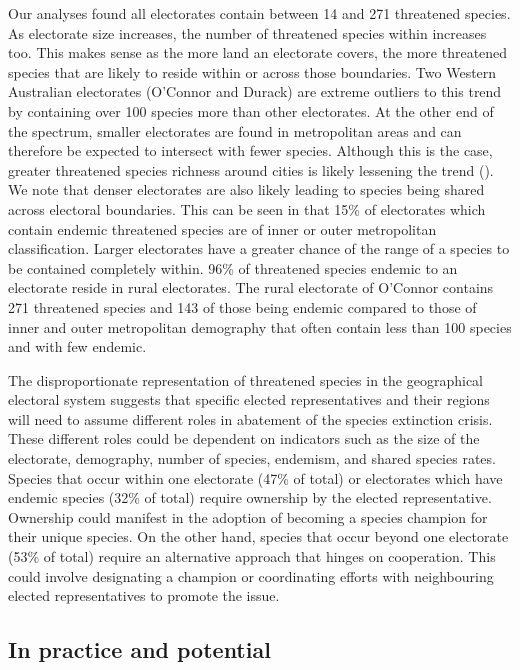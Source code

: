 \documentclass[a4paper,11pt]{article}
\begin{document}
Our analyses found all electorates contain between 14 and 271 threatened species. As electorate size increases, the number of threatened species within increases too. This makes sense as the more land an electorate covers, the more threatened species that are likely to reside within or across those boundaries. Two Western Australian electorates (O'Connor and Durack) are extreme outliers to this trend by containing over 100 species more than other electorates. At the other end of the spectrum, smaller electorates are found in metropolitan areas and can therefore be expected to intersect with fewer species. Although this is the case, greater threatened species richness around cities is likely lessening the trend (\cite{ivesCitiesAreHotspots2016,schwartzConservationDisenfranchisedUrban2002}). We note that denser electorates are also likely leading to species being shared across electoral boundaries. This can be seen in that 15\% of electorates which contain endemic threatened species are of inner or outer metropolitan classification. Larger electorates have a greater chance of the range of a species to be contained completely within. 96\% of threatened species endemic to an electorate reside in rural electorates. The rural electorate of O'Connor contains 271 threatened species and 143 of those being endemic compared to those of inner and outer metropolitan demography that often contain less than 100 species and with few endemic.

The disproportionate representation of threatened species in the geographical electoral system suggests that specific elected representatives and their regions will need to assume different roles in abatement of the species extinction crisis. These different roles could be dependent on indicators such as the size of the electorate, demography, number of species, endemism, and shared species rates. Species that occur within one electorate (47\% of total) or electorates which have endemic species (32\% of total) require ownership by the elected representative. Ownership could manifest in the adoption of becoming a species champion for their unique species. On the other hand, species that occur beyond one electorate (53\% of total) require an alternative approach that hinges on cooperation. This could involve designating a champion or coordinating efforts with neighbouring elected representatives to promote the issue.

\subsection{In practice and potential}
\end{document}
